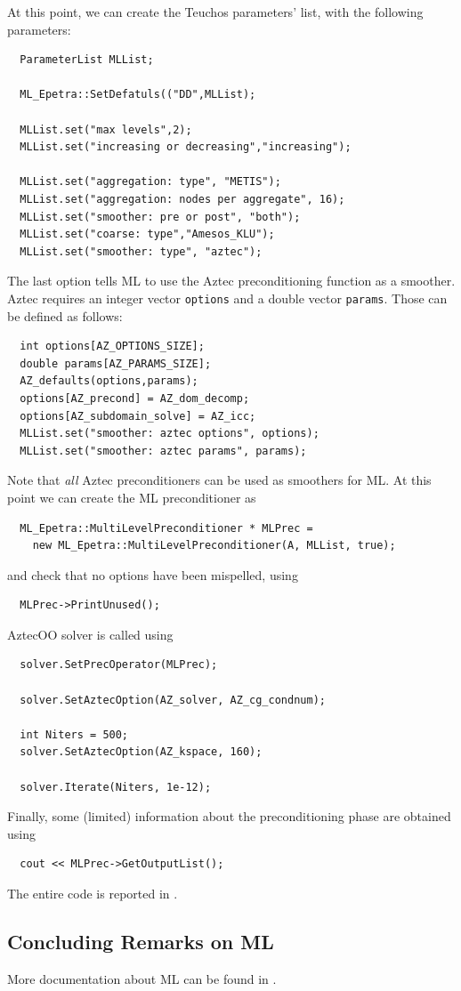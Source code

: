 At this point, we can create the Teuchos parameters' list, with the
following parameters:
\begin{verbatim}
  ParameterList MLList;

  ML_Epetra::SetDefatuls(("DD",MLList);

  MLList.set("max levels",2);
  MLList.set("increasing or decreasing","increasing");

  MLList.set("aggregation: type", "METIS");
  MLList.set("aggregation: nodes per aggregate", 16);
  MLList.set("smoother: pre or post", "both");
  MLList.set("coarse: type","Amesos_KLU");
  MLList.set("smoother: type", "aztec");
\end{verbatim}
The last option tells ML to use the Aztec preconditioning function as a
smoother. Aztec requires an integer vector \verb!options! and a double
vector \verb!params!. Those can be defined as follows:
\begin{verbatim}
  int options[AZ_OPTIONS_SIZE];
  double params[AZ_PARAMS_SIZE];
  AZ_defaults(options,params);
  options[AZ_precond] = AZ_dom_decomp;
  options[AZ_subdomain_solve] = AZ_icc;
  MLList.set("smoother: aztec options", options);
  MLList.set("smoother: aztec params", params);
\end{verbatim}
Note that {\sl all} Aztec preconditioners can be used as smoothers for
ML. 
At this point we can create the ML preconditioner as
\begin{verbatim}
  ML_Epetra::MultiLevelPreconditioner * MLPrec =
    new ML_Epetra::MultiLevelPreconditioner(A, MLList, true);
\end{verbatim}
and check that no options have been mispelled, using
\begin{verbatim}
  MLPrec->PrintUnused();
\end{verbatim}
AztecOO solver is called using
\begin{verbatim}
  solver.SetPrecOperator(MLPrec);

  solver.SetAztecOption(AZ_solver, AZ_cg_condnum);

  int Niters = 500;
  solver.SetAztecOption(AZ_kspace, 160);

  solver.Iterate(Niters, 1e-12);
\end{verbatim}
Finally, some (limited) information about the preconditioning phase are
obtained using
\begin{verbatim}
  cout << MLPrec->GetOutputList();
\end{verbatim}

The entire code is reported in .


\subsection{Concluding Remarks on ML}
\label{sec:ml_concluding}

More documentation about ML can be found in
\cite{ML-home-page,TuminaroTong:00}.

